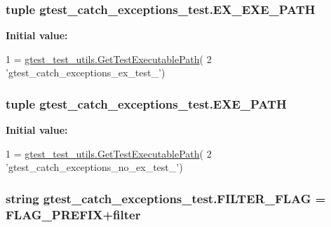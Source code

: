 \subsubsection[{E\+X\+\_\+\+E\+X\+E\+\_\+\+P\+A\+T\+H}]{\setlength{\rightskip}{0pt plus 5cm}tuple gtest\+\_\+catch\+\_\+exceptions\+\_\+test.\+E\+X\+\_\+\+E\+X\+E\+\_\+\+P\+A\+T\+H}\label{namespacegtest__catch__exceptions__test_a4789e6b786fb431c8f4e205ac93782b5}
{\bfseries Initial value\+:}
\begin{DoxyCode}
1 = \hyperlink{namespacegtest__test__utils_a1bdf3cac86afa675ed37629b183048e9}{gtest\_test\_utils.GetTestExecutablePath}(
2     \textcolor{stringliteral}{'gtest\_catch\_exceptions\_ex\_test\_'})
\end{DoxyCode}
\hypertarget{namespacegtest__catch__exceptions__test_a9176972ff83182f11532cbbc27f5cb42}{}
\subsubsection[{E\+X\+E\+\_\+\+P\+A\+T\+H}]{\setlength{\rightskip}{0pt plus 5cm}tuple gtest\+\_\+catch\+\_\+exceptions\+\_\+test.\+E\+X\+E\+\_\+\+P\+A\+T\+H}\label{namespacegtest__catch__exceptions__test_a9176972ff83182f11532cbbc27f5cb42}
{\bfseries Initial value\+:}
\begin{DoxyCode}
1 = \hyperlink{namespacegtest__test__utils_a1bdf3cac86afa675ed37629b183048e9}{gtest\_test\_utils.GetTestExecutablePath}(
2     \textcolor{stringliteral}{'gtest\_catch\_exceptions\_no\_ex\_test\_'})
\end{DoxyCode}
\hypertarget{namespacegtest__catch__exceptions__test_a1a53cfa4c10fe3bdbc85a14fd9692751}{}
\subsubsection[{F\+I\+L\+T\+E\+R\+\_\+\+F\+L\+A\+G}]{\setlength{\rightskip}{0pt plus 5cm}string gtest\+\_\+catch\+\_\+exceptions\+\_\+test.\+F\+I\+L\+T\+E\+R\+\_\+\+F\+L\+A\+G = {\bf F\+L\+A\+G\+\_\+\+P\+R\+E\+F\+I\+X}+\textquotesingle{}filter\textquotesingle{}}\label{namespacegtest__catch__exceptions__test_a1a53cfa4c10fe3bdbc85a14fd9692751}
\hypertarget{namespacegtest__catch__exceptions__test_a2d40f89077ec9fdb51008c263148315f}{}
